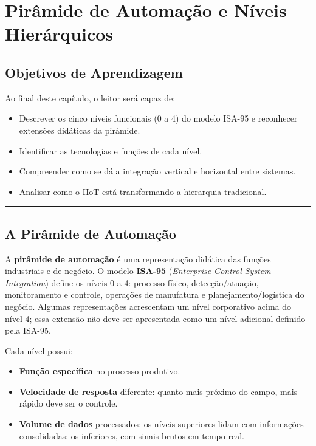 \chapter{Pirâmide de Automação e Níveis Hierárquicos}\label{piruxe2mide-de-automauxe7uxe3o-e-nuxedveis-hieruxe1rquicos}

\section*{Objetivos de Aprendizagem}

Ao final deste capítulo, o leitor será capaz de:

\begin{itemize}
\tightlist
\item
  Descrever os cinco níveis funcionais (0 a 4) do modelo ISA-95 e reconhecer extensões didáticas da pirâmide.
\item
  Identificar as tecnologias e funções de cada nível.
\item
  Compreender como se dá a integração vertical e horizontal entre sistemas.
\item
  Analisar como o IIoT está transformando a hierarquia tradicional.
\end{itemize}

\begin{center}\rule{0.5\linewidth}{0.5pt}\end{center}

\section{A Pirâmide de Automação}\label{a-piruxe2mide-de-automauxe7uxe3o}

A \textbf{pirâmide de automação} é uma representação didática das funções industriais e de negócio. O modelo \textbf{ISA-95} (\emph{Enterprise-Control System Integration}) define os níveis 0 a 4: processo físico, detecção/atuação, monitoramento e controle, operações de manufatura e planejamento/logística do negócio. Algumas representações acrescentam um nível corporativo acima do nível 4; essa extensão não deve ser apresentada como um nível adicional definido pela ISA-95.

Cada nível possui:

\begin{itemize}
\tightlist
\item
  \textbf{Função específica} no processo produtivo.
\item
  \textbf{Velocidade de resposta} diferente: quanto mais próximo do campo, mais rápido deve ser o controle.
\item
  \textbf{Volume de dados} processados: os níveis superiores lidam com informações consolidadas; os inferiores, com sinais brutos em tempo real.
\end{itemize}

